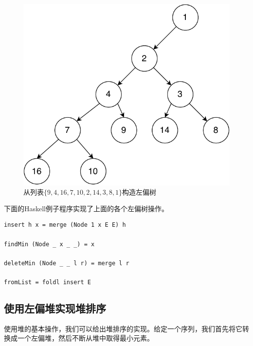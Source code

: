 \documentclass[b5paper]{ctexart}
\begin{document}
\begin{figure}[htbp]
   \begin{center}
   	  \includegraphics[scale=0.5]{img/leftist-tree}
    \caption{从列表$\{9, 4, 16, 7, 10, 2, 14, 3, 8, 1\}$构造左偏树}
    \label{fig:leftist-tree}
   \end{center}
\end{figure}

下面的Haskell例子程序实现了上面的各个左偏树操作。

\lstset{language=Haskell}
\begin{lstlisting}[style=Haskell]
insert h x = merge (Node 1 x E E) h

findMin (Node _ x _ _) = x

deleteMin (Node _ _ l r) = merge l r

fromList = foldl insert E
\end{lstlisting}

\subsection{使用左偏堆实现堆排序}

使用堆的基本操作，我们可以给出堆排序的实现。给定一个序列，我们首先将它转换成一个左偏堆，然后不断从堆中取得最小元素。
\end{document}

